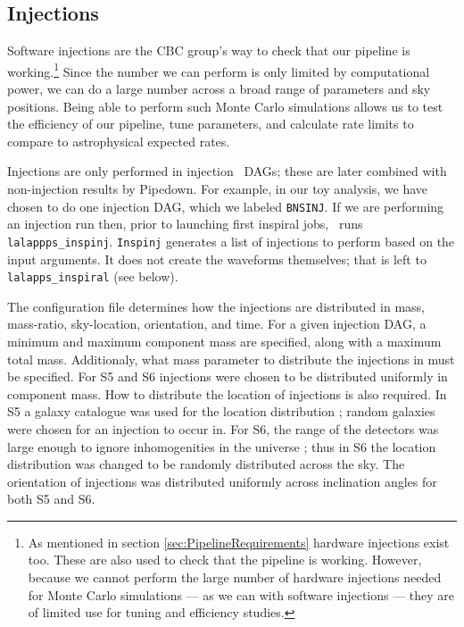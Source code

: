 \subsection{Injections}
\label{sec:inspinj}

Software injections are the \ac{CBC} group's way to check that our pipeline is
working.\footnote{As mentioned in section \ref{sec:PipelineRequirements}
hardware injections exist too. These are also used to check that the pipeline
is working. However, because we cannot perform the large number of hardware
injections needed for Monte Carlo simulations --- as we can with software
injections --- they are of limited use for tuning and efficiency studies.}
Since the number we can perform is only limited by computational power, we can
do a large number across a broad range of parameters and sky positions. Being
able to perform such Monte Carlo simulations allows us to test the efficiency
of our pipeline, tune parameters, and calculate rate limits to compare to
astrophysical expected rates.

Injections are only performed in injection \hipe~\acp{DAG}; these are later
combined with non-injection results by Pipedown. For example, in our toy
analysis, we have chosen to do one injection \ac{DAG}, which we labeled
\texttt{BNSINJ}. If we are performing an injection run then, prior to launching
first inspiral jobs, \hipe~runs \texttt{lalappps\_inspinj}. \texttt{Inspinj}
generates a list of injections to perform based on the input arguments. It does
not create the waveforms themselves; that is left to \texttt{lalapps\_inspiral}
(see below).

The configuration file determines how the injections are distributed in mass,
mass-ratio, sky-location, orientation, and time. For a given injection
\ac{DAG}, a minimum and maximum component mass are specified, along with a
maximum total mass. Additionaly, what mass parameter to distribute the
injections in must be specified. For \ac{S5} and \ac{S6} injections were chosen
to be distributed uniformly in component mass. How to distribute the location
of injections is also required. In \ac{S5} a galaxy catalogue was used for the
location distribution \cite{Collaboration:2009tt, Abbott:2009qj}; random
galaxies were chosen for an injection to occur in. For \ac{S6}, the range of
the detectors was large enough to ignore inhomogenities in the universe
\cite{ratesdoc}; thus in \ac{S6} the location distribution was changed to be
randomly distributed across the sky. The orientation of injections was
distributed uniformly across inclination angles for both \ac{S5} and \ac{S6}.

